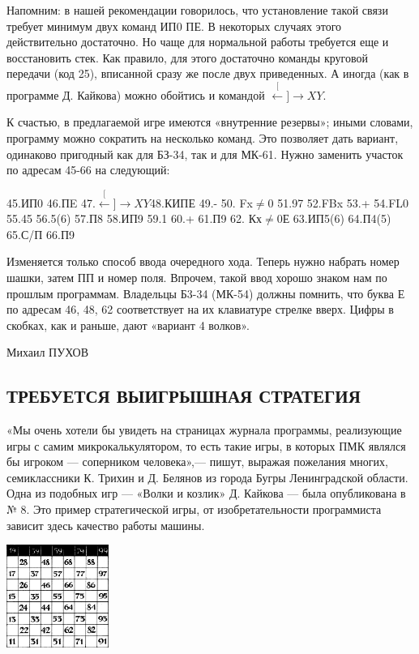 \documentclass[11pt,a4paper,oneside]{article}
\def\XY{$\stackrel[\leftarrow]{\rightarrow}{XY}$}
\begin{document}
Напомним: в нашей рекомендации говорилось, что установление такой связи требует минимум двух команд ИП0 ПЕ. В некоторых случаях этого действительно достаточно. Но чаще для нормальной работы требуется еще и восстановить стек. Как правило, для этого достаточно команды круговой передачи (код 25), вписанной сразу же после двух приведенных. А иногда (как в программе Д. Кайкова) можно обойтись и командой \XY.

К счастью, в предлагаемой игре имеются «внутренние резервы»; иными словами, программу можно сократить на несколько команд. Это позволяет дать вариант, одинаково пригодный как для БЗ-34, так и для МК-61. Нужно заменить участок по адресам 45-66 на следующий:

45.ИП0 46.ПE 47.\XY 48.КИПЕ 49.- 50. Fx$\neq$0 51.97 52.FBx 53.+ 54.FL0 55.45 56.5(6) 57.П8 58.ИП9 59.1 60.+ 61.П9 62. Кх$\neq$0Е 63.ИП5(6) 64.П4(5) 65.С/П 66.П9

Изменяется только способ ввода очередного хода. Теперь нужно набрать номер шашки, затем ПП и номер поля. Впрочем, такой ввод хорошо знаком нам по прошлым программам. Владельцы Б3-34 (МК-54) должны помнить, что буква Е по адресам 46, 48, 62 соответствует на их клавиатуре стрелке вверх. Цифры в скобках, как и раньше, дают «вариант 4 волков».

Михаил ПУХОВ

\subsection{ТРЕБУЕТСЯ ВЫИГРЫШНАЯ СТРАТЕГИЯ}

«Мы очень хотели бы увидеть на страницах журнала программы, реализующие игры с самим микрокалькулятором, то есть такие игры, в которых ПМК являлся бы игроком — соперником человека»,— пишут, выражая пожелания многих, семиклассники К. Трихин и Д. Белянов из города Бугры Ленинградской области. Одна из подобных игр — «Волки и козлик» Д. Кайкова — была опубликована в № 8. Это пример стратегической игры, от изобретательности программиста зависит здесь качество работы машины.

\includegraphics[width=0.25\textwidth]{win_strategy}
\end{document}
